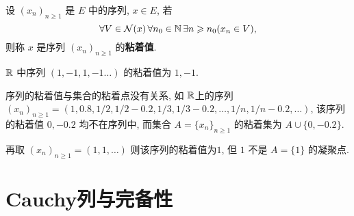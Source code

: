 \begin{Def}[序列的粘着值]\label{def:序列的粘着值}
      设 $ (x_{n})_{n\geqslant1} $ 是 $ E $ 中的序列,  $ x\in E $, 若
      \[
           \forall V\in\mathcal{N}(x)\,\forall n_{0}\in\mathbb{N}\,\exists n\geqslant n_{0}(x_{n}\in V),
      \]
      则称 $ x $ 是序列 $ (x_{n})_{n\geqslant1} $ 的\textbf{粘着值}.  
\end{Def}
\begin{Ex}
     $ \mathbb{R} $ 中序列 $ (1, -1, 1, -1\ldots) $ 的粘着值为 $ 1, -1 $.  
\end{Ex}
\begin{Rmk}
     序列的粘着值与集合的粘着点没有关系, 如 $ \mathbb{R} $上的序列 $ (x_{n})_{n\geqslant1}=(1, 0.8, {1}/{2}, {1}/{2}-0.2, {1}/{3}, {1}/{3}-0.2, \ldots, {1}/{n}, {1}/{n}-0.2, \ldots) $, 该序列的粘着值 $ 0, -0.2 $ 均不在序列中, 而集合 $ A=\{ x_{n} \}_{n\geqslant1} $ 的粘着集为 $ A\cup\{ 0,-0.2 \} $. 

     再取 $ (x_{n})_{n\geqslant1}=(1, 1, \ldots) $ 则该序列的粘着值为$1$,  但 $ 1 $ 不是 $ A=\{ 1 \} $ 的凝聚点.  
\end{Rmk}
\section{Cauchy列与完备性}